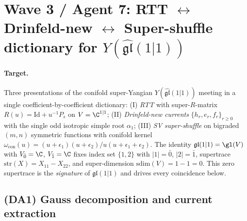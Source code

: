 
\providecommand{\CoHA}{\mathrm{CoHA}}
\providecommand{\Sh}{\mathrm{Sh}}
\providecommand{\Sym}{\mathrm{Sym}}
\providecommand{\fgl}{\mathfrak{gl}}
\providecommand{\str}{\mathrm{str}}
\providecommand{\sgn}{\mathrm{sgn}}
\providecommand{\Id}{\mathrm{Id}}

\section*{Wave 3 / Agent 7: RTT $\leftrightarrow$ Drinfeld-new $\leftrightarrow$
 Super-shuffle dictionary for $Y(\widehat{\fgl}(1|1))$}
\label{sec:wave3-agent7-rtt-drinfeld-shuffle}

\paragraph{Target.} Three presentations of the conifold super-Yangian
$Y(\widehat{\fgl}(1|1))$ meeting in a single coefficient-by-coefficient
dictionary: (I) \emph{RTT} with super-$R$-matrix $R(u) = \Id + u^{-1}P_s$
on $V = \C^{1|1}$; (II) \emph{Drinfeld-new currents} $\{h_{r}, e_{r},
f_{r}\}_{r \geq 0}$ with the single odd isotropic simple root
$\alpha_1$; (III) \emph{SV super-shuffle} on bigraded $(m,n)$
symmetric functions with conifold kernel $\omega_{\mathrm{con}}(u) =
(u+\epsilon_1)(u+\epsilon_2)/u(u+\epsilon_1+\epsilon_2)$. The identity
$\fgl(1|1) = \gl(V)$ with $V_{\bar 0} = \C$, $V_{\bar 1} = \C$ fixes
index set $\{1, 2\}$ with $|1| = \bar 0$, $|2| = \bar 1$, supertrace
$\str(X) = X_{11} - X_{22}$, and super-dimension $\mathrm{sdim}(V) =
1 - 1 = 0$. This zero supertrace is the \emph{signature} of $\fgl(1|1)$
and drives every coincidence below.

\subsection*{(DA1) Gauss decomposition and current extraction}

